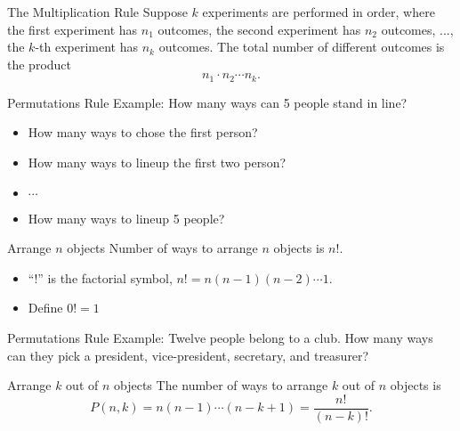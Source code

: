 \documentclass{beamer}
\begin{document}
\begin{frame}{The Multiplication Rule}
Suppose $k$ experiments are performed in order, where the first experiment has $n_1$ outcomes, the second  experiment has $n_2$ outcomes, ..., the $k$-th experiment has $n_k$ outcomes. The total number of different outcomes is the product
$$n_1 \cdot n_2 \cdots n_k.$$


\end{frame}

\begin{frame}{Permutations Rule}
Example: How many ways can 5 people stand in line?
\begin{itemize}
\item How many ways to chose the first person?
    \item How many ways to lineup the first two person?    
    \item $\cdots$
\item How many ways to lineup 5 people?
\end{itemize}


\begin{block}{Arrange $n$ objects}
Number of ways to arrange $n$ objects is $n!$.
\begin{itemize}
\item ``$!$'' is the factorial symbol, $n! = n (n-1)(n-2) \cdots 1$.
\item Define $0!=1$
\end{itemize}
\end{block}
\end{frame}

\begin{frame}{Permutations Rule}
Example: Twelve people belong to a club.  How many ways can they pick a president, vice-president, secretary, and treasurer?

\begin{block}{Arrange $k$ out of $n$ objects}
The number of ways to arrange $k$ out of $n$ objects is 
    $$P(n,k) = n (n-1) \cdots (n-k+1)=\frac{n!}{(n-k)!}.$$
\end{block}
\end{frame}
\end{document}
